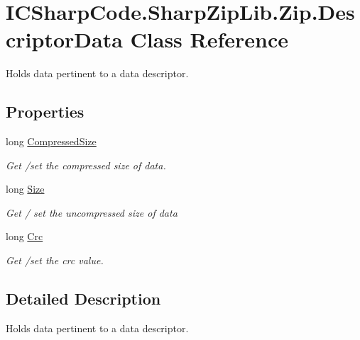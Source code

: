 \hypertarget{class_i_c_sharp_code_1_1_sharp_zip_lib_1_1_zip_1_1_descriptor_data}{}\section{I\+C\+Sharp\+Code.\+Sharp\+Zip\+Lib.\+Zip.\+Descriptor\+Data Class Reference}
\label{class_i_c_sharp_code_1_1_sharp_zip_lib_1_1_zip_1_1_descriptor_data}


Holds data pertinent to a data descriptor.  


\subsection*{Properties}
\begin{DoxyCompactItemize}
\item 
long \hyperlink{class_i_c_sharp_code_1_1_sharp_zip_lib_1_1_zip_1_1_descriptor_data_a1b11df5e0726c189599bf02843093276}{Compressed\+Size}
\begin{DoxyCompactList}\small\item\em Get /set the compressed size of data. \end{DoxyCompactList}\item 
long \hyperlink{class_i_c_sharp_code_1_1_sharp_zip_lib_1_1_zip_1_1_descriptor_data_a1119503f1ccf15fd895e64f9325be6c5}{Size}
\begin{DoxyCompactList}\small\item\em Get / set the uncompressed size of data \end{DoxyCompactList}\item 
long \hyperlink{class_i_c_sharp_code_1_1_sharp_zip_lib_1_1_zip_1_1_descriptor_data_ae143e07a1289896ce3cb3e1a55424c70}{Crc}
\begin{DoxyCompactList}\small\item\em Get /set the crc value. \end{DoxyCompactList}\end{DoxyCompactItemize}


\subsection{Detailed Description}
Holds data pertinent to a data descriptor. 



